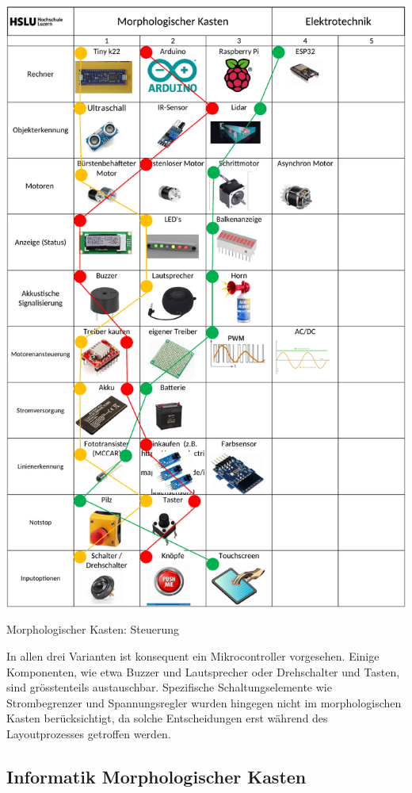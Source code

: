 \begin{table}[H]
\centering
\includegraphics[width=\textwidth -5mm]{assets/MK_Elektrotechnik.pdf}
\caption{Morphologischer Kasten: Steuerung}
\label{table:mk-elektrotechnik}
\end{table}

In allen drei Varianten ist konsequent ein Mikrocontroller vorgesehen. Einige Komponenten, wie etwa Buzzer und Lautsprecher oder Drehschalter und Tasten, sind grösstenteils austauschbar. Spezifische Schaltungselemente wie Strombegrenzer und Spannungsregler wurden hingegen nicht im morphologischen Kasten berücksichtigt, da solche Entscheidungen erst während des Layoutprozesses getroffen werden.


\subsection{Informatik Morphologischer Kasten}

